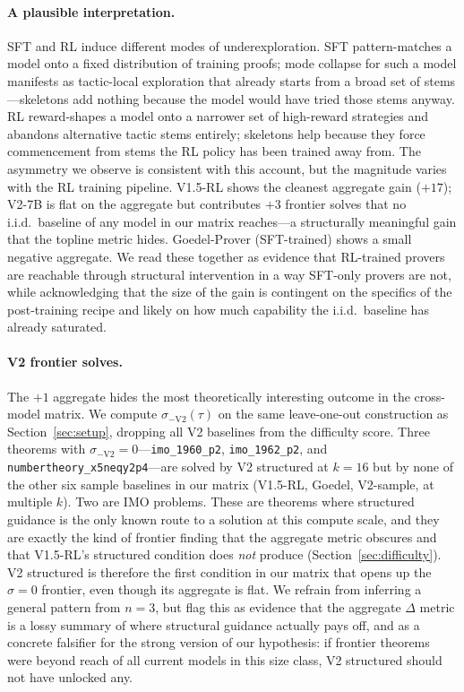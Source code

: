 \documentclass{article}
\begin{document}
\paragraph{A plausible interpretation.} SFT and RL induce different modes of underexploration. SFT pattern-matches a model onto a fixed distribution of training proofs; mode collapse for such a model manifests as tactic-local exploration that already starts from a broad set of stems---skeletons add nothing because the model would have tried those stems anyway. RL reward-shapes a model onto a narrower set of high-reward strategies and abandons alternative tactic stems entirely; skeletons help because they force commencement from stems the RL policy has been trained away from. The asymmetry we observe is consistent with this account, but the magnitude varies with the RL training pipeline. V1.5-RL shows the cleanest aggregate gain ($+17$); V2-7B is flat on the aggregate but contributes $+3$ frontier solves that no i.i.d.\ baseline of any model in our matrix reaches---a structurally meaningful gain that the topline metric hides. Goedel-Prover (SFT-trained) shows a small negative aggregate. We read these together as evidence that RL-trained provers are reachable through structural intervention in a way SFT-only provers are not, while acknowledging that the size of the gain is contingent on the specifics of the post-training recipe and likely on how much capability the i.i.d.\ baseline has already saturated.

\paragraph{V2 frontier solves.} The $+1$ aggregate hides the most theoretically interesting outcome in the cross-model matrix. We compute $\sigma_{-\text{V2}}(\tau)$ on the same leave-one-out construction as Section~\ref{sec:setup}, dropping all V2 baselines from the difficulty score. Three theorems with $\sigma_{-\text{V2}}{=}0$---\texttt{imo\_1960\_p2}, \texttt{imo\_1962\_p2}, and \texttt{numbertheory\_x5neqy2p4}---are solved by V2 structured at $k{=}16$ but by none of the other six sample baselines in our matrix (V1.5-RL, Goedel, V2-sample, at multiple $k$). Two are IMO problems. These are theorems where structured guidance is the only known route to a solution at this compute scale, and they are exactly the kind of frontier finding that the aggregate metric obscures and that V1.5-RL's structured condition does \emph{not} produce (Section~\ref{sec:difficulty}). V2 structured is therefore the first condition in our matrix that opens up the $\sigma{=}0$ frontier, even though its aggregate is flat. We refrain from inferring a general pattern from $n{=}3$, but flag this as evidence that the aggregate $\Delta$ metric is a lossy summary of where structural guidance actually pays off, and as a concrete falsifier for the strong version of our hypothesis: if frontier theorems were beyond reach of all current models in this size class, V2 structured should not have unlocked any.
\end{document}
